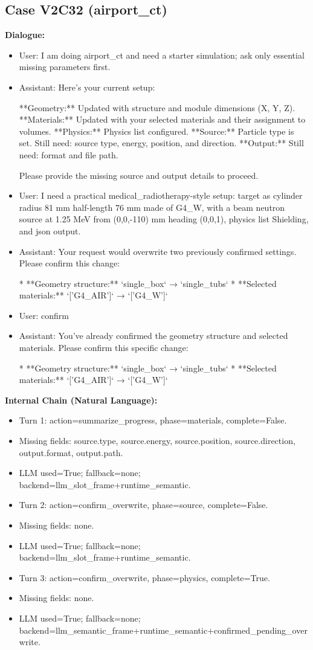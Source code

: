 \documentclass[11pt]{ctexart}
\begin{document}
\subsection{Case V2C32 (airport\_ct)}
\textbf{Dialogue:}
\begin{itemize}
\item User: I am doing airport\_ct and need a starter simulation; ask only essential missing parameters first.
\item Assistant: Here's your current setup:

**Geometry:** Updated with structure and module dimensions (X, Y, Z).
**Materials:** Updated with your selected materials and their assignment to volumes.
**Physics:** Physics list configured.
**Source:** Particle type is set. Still need: source type, energy, position, and direction.
**Output:** Still need: format and file path.

Please provide the missing source and output details to proceed.
\item User: I need a practical medical\_radiotherapy-style setup: target as cylinder radius 81 mm half-length 76 mm made of G4\_W, with a beam neutron source at 1.25 MeV from (0,0,-110) mm heading (0,0,1), physics list Shielding, and json output.
\item Assistant: Your request would overwrite two previously confirmed settings. Please confirm this change:

*   **Geometry structure:** `single\_box` → `single\_tubs`
*   **Selected materials:** `['G4\_AIR']` → `['G4\_W']`
\item User: confirm
\item Assistant: You've already confirmed the geometry structure and selected materials. Please confirm this specific change:

*   **Geometry structure:** `single\_box` → `single\_tubs`
*   **Selected materials:** `['G4\_AIR']` → `['G4\_W']`
\end{itemize}
\textbf{Internal Chain (Natural Language):}
\begin{itemize}
\item Turn 1: action=summarize\_progress, phase=materials, complete=False.
\item Missing fields: source.type, source.energy, source.position, source.direction, output.format, output.path.
\item LLM used=True; fallback=none; backend=llm\_slot\_frame+runtime\_semantic.
\item Turn 2: action=confirm\_overwrite, phase=source, complete=False.
\item Missing fields: none.
\item LLM used=True; fallback=none; backend=llm\_slot\_frame+runtime\_semantic.
\item Turn 3: action=confirm\_overwrite, phase=physics, complete=True.
\item Missing fields: none.
\item LLM used=True; fallback=none; backend=llm\_semantic\_frame+runtime\_semantic+confirmed\_pending\_overwrite.
\end{itemize}
\end{document}
